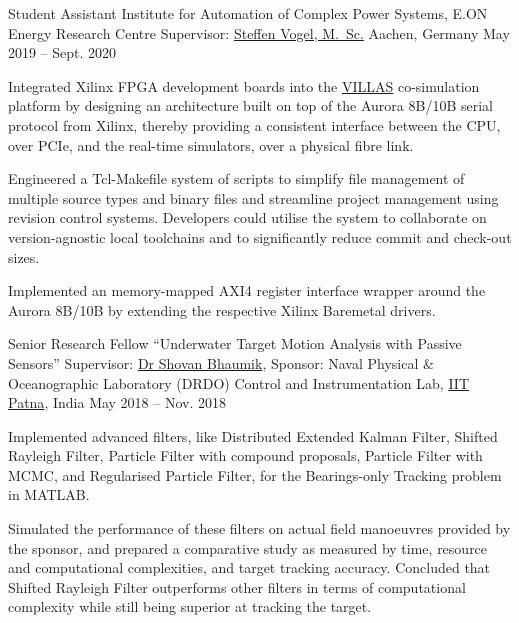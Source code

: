 \begin{cvexperience}
\cvposition
	{Student Assistant} %
	{Institute for Automation of Complex Power Systems, E.ON Energy Research Centre} %
	{Supervisor: \href{https://www.acs.eonerc.rwth-aachen.de/go/id/msul}{Steffen Vogel, M.\, Sc.}} %
	{Aachen, Germany} %
	{May 2019 -- Sept. 2020} %
	{\begin{cvitems}
		\item {Integrated Xilinx FPGA development boards into the \href{https://villas.fein-aachen.org}{VILLAS} co-simulation platform by designing an architecture built on top of the Aurora 8B/10B serial protocol from Xilinx, thereby providing a consistent interface between the CPU, over PCIe, and the real-time simulators, over a physical fibre link.}
		\item {Engineered a Tcl-Makefile system of scripts to simplify file management of multiple source types and binary files and streamline project management using revision control systems. Developers could utilise the system to collaborate on version-agnostic local toolchains and to significantly reduce commit and check-out sizes.}
		\item {Implemented an memory-mapped AXI4 register interface wrapper around the Aurora 8B/10B by extending the respective Xilinx Baremetal drivers.}
	\end{cvitems}}

\cvposition
	{Senior Research Fellow} %
	{``Underwater Target Motion Analysis with Passive Sensors''} %
	{Supervisor: \href{http://www.tutorialpoint.org/ShovanBhaumik/index.html}{Dr Shovan Bhaumik}, Sponsor: Naval Physical \& Oceanographic Laboratory (DRDO)} %
	{Control and Instrumentation Lab, \href{https://www.iitp.ac.in}{IIT Patna}, India} %
	{May 2018 -- Nov. 2018} %
	{\begin{cvitems} %
		\item {Implemented advanced filters, like Distributed Extended Kalman Filter, Shifted Rayleigh Filter, Particle Filter with compound proposals, Particle Filter with MCMC, and Regularised Particle Filter, for the Bearings-only Tracking problem in MATLAB.}
		\item {Simulated the performance of these filters on actual field manoeuvres provided by the sponsor, and prepared a comparative study as measured by time, resource and computational complexities, and target tracking accuracy. Concluded that Shifted Rayleigh Filter outperforms other filters in terms of computational complexity while still being superior at tracking the target.}
	\end{cvitems}}


\end{cvexperience}
